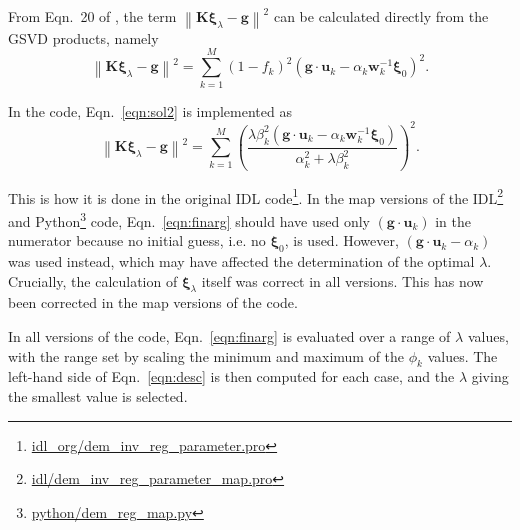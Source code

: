 \documentclass[12pt,a4paper]{article}
\begin{document}
From Eqn.~20 of \citet{1992InvPr...8..849H}, the term $\left\|\mathbf{K}\boldsymbol{\xi}_\lambda-\mathbf{g}\right\|^2$ can be calculated directly from the GSVD products, namely
\begin{equation}\label{eqn:sol2}
\left\|\mathbf{K}\boldsymbol{\xi}_\lambda-\mathbf{g}\right\|^2=\sum_{k=1}^{M} (1-f_k)^2\left(
\mathbf{g}\cdot \mathbf{u}_k - \alpha_k\mathbf{w}_k^{-1}\boldsymbol{\xi}_0
\right)^2.
\end{equation}

In the code, Eqn.~\ref{eqn:sol2} is implemented as
\begin{equation}\label{eqn:finarg}
  \left\|\mathbf{K}\boldsymbol{\xi}_\lambda-\mathbf{g}\right\|^2=\sum_{k=1}^{M} \left(\frac{\lambda\beta_k^2\left(\mathbf{g}\cdot \mathbf{u}_k-\alpha_k\mathbf{w}_k^{-1}\boldsymbol{\xi}_0\right)}{\alpha_k^2 + \lambda\beta_k^2}\right)^2.
\end{equation}

This is how it is done in the original IDL code\footnote{\href{https://github.com/ianan/demreg/blob/master/idl_org/dem_inv_reg_parameter.pro}{idl\_org/dem\_inv\_reg\_parameter.pro}}. In the map versions of the IDL\footnote{\href{https://github.com/ianan/demreg/blob/master/idl/dem_inv_reg_parameter_map.pro}{idl/dem\_inv\_reg\_parameter\_map.pro}} and Python\footnote{\href{https://github.com/ianan/demreg/blob/master/python/dem_reg_map.py}{python/dem\_reg\_map.py}} code, Eqn.~\ref{eqn:finarg} should have used only $\left(\mathbf{g}\cdot \mathbf{u}_k\right)$ in the numerator because no initial guess, i.e. no $\boldsymbol{\xi}_0$, is used. However, $\left(\mathbf{g}\cdot \mathbf{u}_k-\alpha_k\right)$ was used instead, which may have affected the determination of the optimal $\lambda$. Crucially, the calculation of $\boldsymbol{\xi}_\lambda$ itself was correct in all versions. This has now been corrected in the map versions of the code.

In all versions of the code, Eqn.~\ref{eqn:finarg} is evaluated over a range of $\lambda$ values, with the range set by scaling the minimum and maximum of the $\phi_k$ values. The left-hand side of Eqn.~\ref{eqn:desc} is then computed for each case, and the $\lambda$ giving the smallest value is selected.
\end{document}
